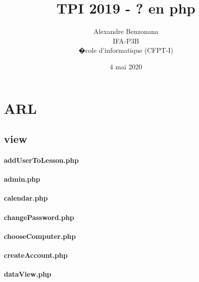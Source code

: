 \documentclass[a4paper,12pt]{report}
\begin{document}
	
	\title{TPI 2019 - ? en php }
	\author{Alexandre Benzonana \\ IFA-P3B \\ �cole d'informatique (CFPT-I)}
	\date{4 mai 2020}
	\maketitle	
		
\tableofcontents
\newcommand{\mylstinputlisting}[1]{}
	
\chapter{ARL}
	\section{view}
		\subsubsection{addUserToLesson.php}
			\mylstinputlisting{./web/view/addUserToLesson.php}
\newpage
		\subsubsection{admin.php}
			\mylstinputlisting{./web/view/admin.php}
\newpage
		\subsubsection{calendar.php}
			\mylstinputlisting{./web/view/calendar.php}
\newpage
		\subsubsection{changePassword.php}
			\mylstinputlisting{./web/view/changePassword.php}
\newpage
		\subsubsection{chooseComputer.php}
			\mylstinputlisting{./web/view/chooseComputer.php}
\newpage
		\subsubsection{createAccount.php}
			\mylstinputlisting{./web/view/createAccount.php}
\newpage
		\subsubsection{dataView.php}
			\mylstinputlisting{./web/view/dataView.php}
\newpage
\end{document}
